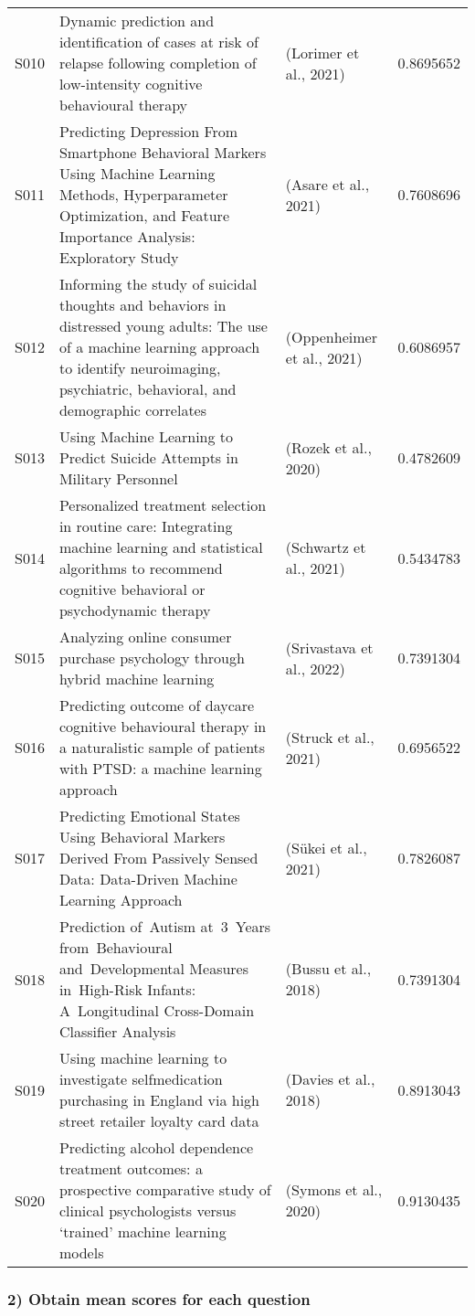 \documentclass[
]{article}
\begin{document}
\begin{longtable}{lllr}
S010 & Dynamic prediction and identification of cases at risk of relapse following completion of low-intensity cognitive behavioural therapy & (Lorimer et al., 2021) & 0.8695652 \\ 
S011 & Predicting Depression From Smartphone Behavioral Markers Using Machine Learning Methods, Hyperparameter Optimization, and Feature Importance Analysis: Exploratory Study & (Asare et al., 2021) & 0.7608696 \\ 
S012 & Informing the study of suicidal thoughts and behaviors in distressed young adults: The use of a machine learning approach to identify neuroimaging, psychiatric, behavioral, and demographic correlates & (Oppenheimer et al., 2021) & 0.6086957 \\ 
S013 & Using Machine Learning to Predict Suicide Attempts in Military Personnel & (Rozek et al., 2020) & 0.4782609 \\ 
S014 & Personalized treatment selection in routine care: Integrating machine learning and statistical algorithms to recommend cognitive behavioral or psychodynamic therapy & (Schwartz et al., 2021) & 0.5434783 \\ 
S015 & Analyzing online consumer purchase psychology through hybrid machine learning & (Srivastava et al., 2022) & 0.7391304 \\ 
S016 & Predicting outcome of daycare cognitive behavioural therapy in a naturalistic sample of patients with PTSD: a machine learning approach & (Struck et al., 2021) & 0.6956522 \\ 
S017 & Predicting Emotional States Using Behavioral Markers Derived From Passively Sensed Data: Data-Driven Machine Learning Approach & (Sükei et al., 2021) & 0.7826087 \\ 
S018 & Prediction of Autism at 3 Years from Behavioural and Developmental Measures in High-Risk Infants: A Longitudinal Cross-Domain Classifier Analysis & (Bussu et al., 2018) & 0.7391304 \\ 
S019 & Using machine learning to investigate selfmedication purchasing in England via high street retailer loyalty card data & (Davies et al., 2018) & 0.8913043 \\ 
S020 & Predicting alcohol dependence treatment outcomes: a prospective comparative study of clinical psychologists versus ‘trained’ machine learning models & (Symons et al., 2020) & 0.9130435 \\ 
\bottomrule
\end{longtable}

\hypertarget{obtain-mean-scores-for-each-question}{%
\subsubsection{2) Obtain mean scores for each
question}\label{obtain-mean-scores-for-each-question}}
\end{document}
